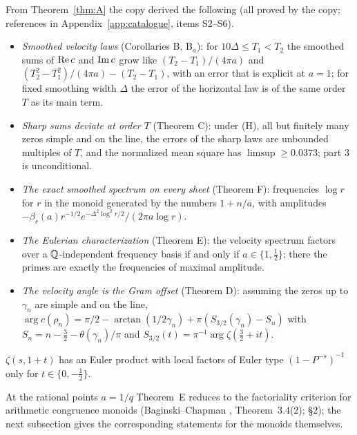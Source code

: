 From Theorem~\ref{thm:A} the copy derived the following (all proved by the copy; references in Appendix~\ref{app:catalogue}, items S2--S6).
\begin{itemize}
\item \emph{Smoothed velocity laws} (Corollaries B, B$_a$): for $10\Delta\le T_1<T_2$ the smoothed sums of $\operatorname{Re} c$ and $\operatorname{Im} c$ grow like $(T_2-T_1)/(4\pi a)$ and $(T_2^2-T_1^2)/(4\pi a)-(T_2-T_1)$, with an error that is explicit at $a=1$; for fixed smoothing width $\Delta$ the error of the horizontal law is of the same order $T$ as its main term.
\item \emph{Sharp sums deviate at order $T$} (Theorem C): under (H), all but finitely many zeros simple and on the line, the errors of the sharp laws are unbounded multiples of $T$, and the normalized mean square has $\limsup\ge0.0373$; part 3 is unconditional.
\item \emph{The exact smoothed spectrum on every sheet} (Theorem F): frequencies $\log r$ for $r$ in the monoid generated by the numbers $1+n/a$, with amplitudes $-\beta_r(a)r^{-1/2}e^{-\Delta^2\log^2r/2}/(2\pi a\log r)$.
\item \emph{The Eulerian characterization} (Theorem E): the velocity spectrum factors over a $\mathbb{Q}$-independent frequency basis if and only if $a\in\{1,\tfrac12\}$; there the primes are exactly the frequencies of maximal amplitude.
\item \emph{The velocity angle is the Gram offset} (Theorem D): assuming the zeros up to $\gamma_n$ are simple and on the line, $\arg c(\rho_n)=\pi/2-\arctan(1/2\gamma_n)+\pi(S_{3/2}(\gamma_n)-S_n)$ with $S_n=n-\tfrac32-\theta(\gamma_n)/\pi$ and $S_{3/2}(t)=\pi^{-1}\arg\zeta(\tfrac32+it)$.
\end{itemize}

\begin{corollary}\label{cor:eulerian}
$\zeta(s,1+t)$ has an Euler product with local factors of Euler type $(1-P^{-s})^{-1}$ only for $t\in\{0,-\tfrac12\}$.
\end{corollary}

At the rational points $a=1/q$ Theorem~E reduces to the factoriality criterion for arithmetic congruence monoids (Baginski--Chapman \cite{BaginskiChapman}, Theorem~3.4(2);  §2); the next subsection gives the corresponding statements for the monoids themselves.

